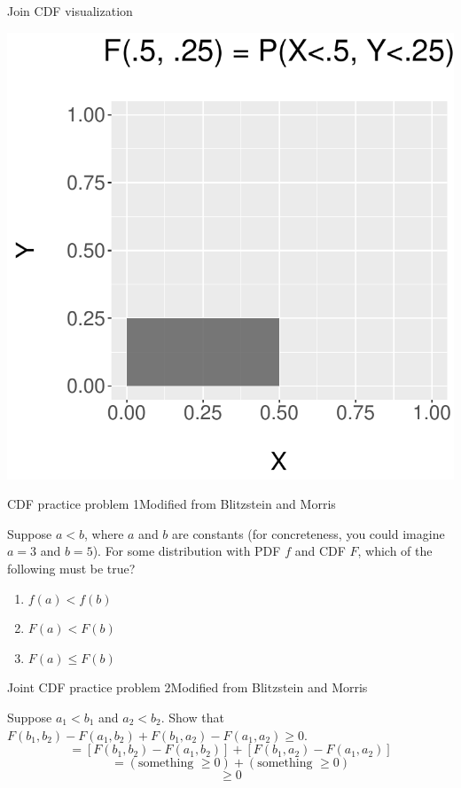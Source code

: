 \documentclass{beamer}
\begin{document}
\begin{frame}{Join CDF visualization}
\begin{center}
\includegraphics[scale=.6]{figures/Joint_CDF.pdf}
\end{center}
\end{frame}

\begin{frame}{CDF practice problem 1}{Modified from Blitzstein and Morris}

Suppose $a<b$, where $a$ and $b$ are constants (for concreteness, you could imagine $a=3$ and $b=5$). For some distribution with PDF $f$ and CDF $F$, which of the following must be true?
\begin{enumerate}
\item $f(a)<f(b)$
\item $F(a)<F(b)$
\item $F(a)\leq F(b)$
\end{enumerate}
\end{frame}

\begin{frame}{Joint CDF practice problem 2}{Modified from Blitzstein and Morris}

Suppose $a_1<b_1$ and $a_2<b_2$. Show that $F(b_1,b_2)-F(a_1,b_2)+F(b_1,a_2)-F(a_1,a_2)\geq 0$. \\
\pause
$$=\left[F(b_1,b_2)-F(a_1,b_2)\right]+\left[F(b_1,a_2)-F(a_1,a_2)\right]$$
\pause
$$=(\text{something }\geq 0) + (\text{something }\geq 0)$$
\pause
$$\geq 0$$
\end{frame}
\end{document}
